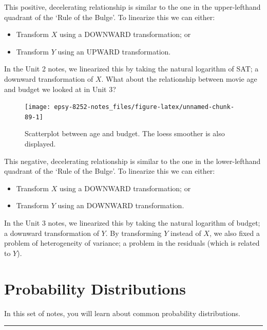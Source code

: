 \documentclass[]{book}
\providecommand{\tightlist}{%
  \setlength{\itemsep}{0pt}\setlength{\parskip}{0pt}}
\begin{document}
This positive, decelerating relationship is similar to the one in the upper-lefthand quadrant of the `Rule of the Bulge'. To linearize this we can either:

\begin{itemize}
\tightlist
\item
  Transform \(X\) using a DOWNWARD transformation; or
\item
  Transform \(Y\) using an UPWARD transformation.
\end{itemize}

In the Unit 2 notes, we linearized this by taking the natural logarithm of SAT; a downward transformation of \(X\). What about the relationship between movie age and budget we looked at in Unit 3?

\begin{figure}

{\centering \texttt{[image: epsy-8252-notes\_files/figure-latex/unnamed-chunk-89-1]} 

}

\caption{Scatterplot between age and budget. The loess smoother is also displayed.}\label{fig:unnamed-chunk-89}
\end{figure}

This negative, decelerating relationship is similar to the one in the lower-lefthand quadrant of the `Rule of the Bulge'. To linearize this we can either:

\begin{itemize}
\tightlist
\item
  Transform \(X\) using a DOWNWARD transformation; or
\item
  Transform \(Y\) using an DOWNWARD transformation.
\end{itemize}

In the Unit 3 notes, we linearized this by taking the natural logarithm of budget; a downward transformation of \(Y\). By transforming \(Y\) instead of \(X\), we also fixed a problem of heterogeneity of variance; a problem in the residuals (which is related to \(Y\)).

\hypertarget{probability-distributions}{%
\chapter{Probability Distributions}\label{probability-distributions}}

In this set of notes, you will learn about common probability distributions.

\begin{center}\rule{0.5\linewidth}{\linethickness}\end{center}
\end{document}
